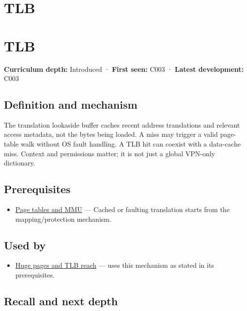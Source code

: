 \hypertarget{appendix-7a2d9c5ce511}{}
\section*{TLB}
\section{TLB}\label{appendix-7a2d9c5ce511-tlb}

\textbf{Curriculum depth:} Introduced · \textbf{First seen:} C003 · \textbf{Latest development:} C003

\subsection{Definition and mechanism}\label{appendix-7a2d9c5ce511-definition-and-mechanism}

The translation lookaside buffer caches recent address translations and relevant access metadata, not the bytes being loaded. A miss may trigger a valid page-table walk without OS fault handling. A TLB hit can coexist with a data-cache miss. Context and permissions matter; it is not just a global VPN-only dictionary.

\subsection{Prerequisites}\label{appendix-7a2d9c5ce511-prerequisites}

\begin{itemize}
\tightlist
\item
  \hyperref[appendix-01e5905165c4]{Page tables and MMU} --- Cached or faulting translation starts from the mapping/protection mechanism.
\end{itemize}

\subsection{Used by}\label{appendix-7a2d9c5ce511-used-by}

\begin{itemize}
\tightlist
\item
  \hyperref[appendix-ce688d1acdab]{Huge pages and TLB reach} --- uses this mechanism as stated in its prerequisites.
\end{itemize}

\subsection{Recall and next depth}\label{appendix-7a2d9c5ce511-recall-and-next-depth}

